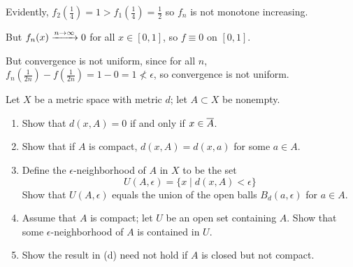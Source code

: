 \documentclass[a4paper, 12pt]{article}
\begin{document}
\begin{solution}
    Evidently, $f_2(\frac{1}{4}) = 1 > f_1(\frac{1}{4}) = \frac{1}{2}$  so $f_n$ is not monotone increasing.

    But $f_n(x) \xrightarrow{n \to \infty} 0$ for all $x \in [0, 1]$, so $f \equiv 0$ on $[0, 1]$.

    But convergence is not uniform, since for all $n$, $f_n(\frac{1}{2n}) - f(\frac{1}{2n}) = 1 - 0 = 1 \not < \epsilon$, so convergence is not uniform.
\end{solution}

\begin{problem} 
    Let $X$ be a metric space with metric $d$; let $A \subset X$ be nonempty.
\begin{enumerate}
\item Show that $d(x, A) = 0$ if and only if $x \in \overline{A}$.
\item Show that if $A$ is compact, $d(x, A) = d(x, a)$ for some $a \in A$.
\item Define the $\epsilon$-neighborhood of $A$ in $X$ to be the set \begin{equation*}
U(A, \epsilon) = \{x \mid d(x, A) < \epsilon\}
\end{equation*}
Show that $U(A, \epsilon)$ equals the union of the open balls $B_d(a, \epsilon)$ for $a \in A$.
\item Assume that $A$ is compact; let $U$ be an open set containing $A$. Show that some $\epsilon$-neighborhood of $A$ is contained in $U$.
\item Show the result in (d) need not hold if $A$ is closed but not compact.
\end{enumerate}
\end{problem}
\end{document}
